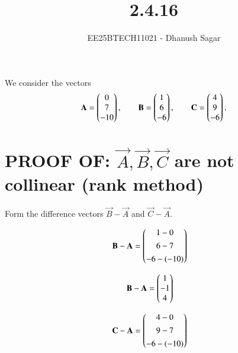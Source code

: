 \documentclass[journal]{IEEEtran}
\begin{document}



\title{2.4.16}
\author{EE25BTECH11021 - Dhanush Sagar
}
{\let\newpage\relax\maketitle}

\renewcommand{\thefigure}{\theenumi}
\renewcommand{\thetable}{\theenumi}
\setlength{\intextsep}{10pt} %


\renewcommand{\thetable}{\theenumi}






We consider the vectors
\begin{align*}
\mathbf{A} = \begin{pmatrix}0\\7\\-10\end{pmatrix}, \qquad
\mathbf{B} = \begin{pmatrix}1\\6\\-6\end{pmatrix}, \qquad
\mathbf{C} = \begin{pmatrix}4\\9\\-6\end{pmatrix}.
\end{align*}

\section*{ PROOF OF: $\vec{A},\vec{B},\vec{C}$ are not collinear (rank method)}
Form the difference vectors $\vec{B}-\vec{A}$ and $\vec{C}-\vec{A}$.

\begin{align}
\mathbf{B}-\mathbf{A} &= \begin{pmatrix}1-0\\[4pt]6-7\\[4pt]-6-(-10)\end{pmatrix}
\end{align}

\begin{align}
\mathbf{B}-\mathbf{A} &= \begin{pmatrix}1\\-1\\4\end{pmatrix}
\end{align}

\begin{align}
\mathbf{C}-\mathbf{A} &= \begin{pmatrix}4-0\\[4pt]9-7\\[4pt]-6-(-10)\end{pmatrix}
\end{align}
\end{document}
